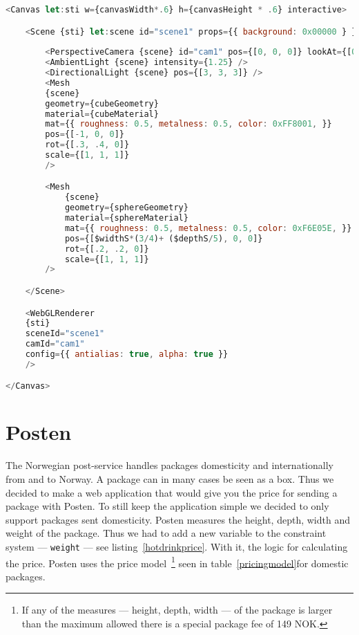 \begin{lstlisting}[caption={Example of a SveltThree setup},label=sveltthreesetup, language=javascript]
<Canvas let:sti w={canvasWidth*.6} h={canvasHeight * .6} interactive>

    <Scene {sti} let:scene id="scene1" props={{ background: 0x00000 } } >
        
        <PerspectiveCamera {scene} id="cam1" pos={[0, 0, 0]} lookAt={[0, 0, 0]} />
        <AmbientLight {scene} intensity={1.25} />
        <DirectionalLight {scene} pos={[3, 3, 3]} />
        <Mesh
        {scene}
        geometry={cubeGeometry}
        material={cubeMaterial}
        mat={{ roughness: 0.5, metalness: 0.5, color: 0xFF8001, }}
        pos={[-1, 0, 0]}
        rot={[.3, .4, 0]}
        scale={[1, 1, 1]} 
        />

        <Mesh
            {scene}
            geometry={sphereGeometry}
            material={sphereMaterial}
            mat={{ roughness: 0.5, metalness: 0.5, color: 0xF6E05E, }}
            pos={[$widthS*(3/4)+ ($depthS/5), 0, 0]}
            rot={[.2, .2, 0]}
            scale={[1, 1, 1]} 
        />

    </Scene>

    <WebGLRenderer
    {sti}
    sceneId="scene1"
    camId="cam1"
    config={{ antialias: true, alpha: true }} 
    />

</Canvas>
\end{lstlisting}

\section{Posten}
The Norwegian post-service handles packages domesticity and internationally from 
and to Norway. 
A package can in many cases be seen as a box. Thus we decided to make a web application 
that would give you the price for sending a package with Posten. To still keep the 
application simple we decided to only support packages sent domesticity. Posten 
measures the height, depth, width and weight of the package. Thus we had to add a new 
variable to the constraint system --- \texttt{weight} --- see listing~\ref{hotdrinkprice}. 
With it, the logic for calculating the price. Posten uses the price
model~\cite{postenNorgespakken}\footnote{If any of the measures --- height, depth, width --- of the package is larger than the maximum allowed there is a special package fee of 149 NOK.} 
seen in table~\ref{pricingmodel}for domestic packages.

